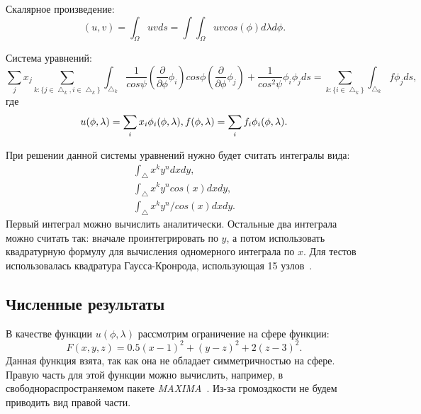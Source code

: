 \documentclass[a4paper]{article}
\begin{document}
Скалярное произведение:
\begin{equation*}
(u, v) = \int_\Omega u v ds = \int\int_\Omega u v cos(\phi)d\lambda d\phi.
\end{equation*}

Система уравнений:
\begin{equation*}
\sum_j x_j \sum_{k: \{j\in\bigtriangleup_k,
  i\in\bigtriangleup_k\}}\int_{\bigtriangleup_k}\frac{1}{cos\psi}(\frac{\partial}{\partial
  \phi} \phi_i) cos\phi (\frac{\partial}{\partial \phi}
\phi_j)+\frac{1}{cos^2\psi}\phi_i\phi_j ds =
\sum_{k:\{i\in\bigtriangleup_k\}}\int_{\bigtriangleup_k}f \phi_j ds, 
\end{equation*}
где
\begin{equation*}
u(\phi,\lambda)=\sum_i x_i \phi_i(\phi, \lambda),\\
f(\phi,\lambda)=\sum_i f_i \phi_i(\phi, \lambda).
\end{equation*}

При решении данной системы уравнений нужно будет считать интегралы вида:
\begin{equation*}
\begin{split}
\int_\bigtriangleup x^k y^n dx dy,\\
\int_\bigtriangleup x^k y^n cos(x) dx dy,\\
\int_\bigtriangleup x^k y^n / cos(x) dx dy.
\end{split}
\end{equation*}
Первый интеграл можно вычислить аналитически. Остальные два интеграла
можно считать так: вначале проинтегрировать по $y$, а потом использовать
квадратурную формулу для вычисления одномерного интеграла по $x$. Для
тестов использовалась квадратура Гаусса-Кронрода, использующая 15
узлов~\cite{kronrod}.

\subsection*{Численные результаты}
В качестве функции $u(\phi,\lambda)$ рассмотрим ограничение на сфере
функции:
\begin{equation*}
F(x,y,z)=0.5(x-1)^2+(y-z)^2+2(z-3)^2.
\end{equation*}
Данная функция взята, так как она не обладает симметричностью на
сфере. Правую часть для этой функции можно вычислить, например, в
свободнораспространяемом пакете {\it MAXIMA}~\cite{maxima}. Из-за громоздкости не
будем приводить вид правой части. 
\end{document}
